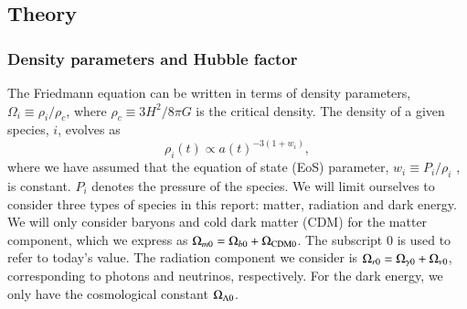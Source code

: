 

\subsection{Theory}\label{ssec:M1:theory}

\subsubsection{Density parameters and Hubble factor}

The Friedmann equation can be written in terms of density parameters, $\Omega_i\equiv \rho_i/\rho_c$, where $\rho_c\equiv 3H^2/8\pi G$ is the critical density. The density of a given species, $i$, evolves as \cite[Eq. (2.61)]{Dodelson}
\begin{equation}
    \rho_i(t)\propto a(t)^{-3(1+w_i)}, \label{eq:M1:theory:rho_i_eos_dependence}
\end{equation}
where we have assumed that the equation of state (EoS) parameter, $w_i \equiv P_i/\rho_i$ \cite[Eq. 2.60]{Dodelson}, is constant. $P_i$ denotes the pressure of the species. 
%
We will limit ourselves to consider three types of species in this report: matter, radiation and dark energy. We will only consider baryons and cold dark matter (CDM) for the matter component, which we express as $\Omega_{m0}=\Omega_{b0}+\Omega_\mathrm{CDM0}$. The subscript $0$ is used to refer to today's value. The radiation component we consider is $\Omega_{r0}=\Omega_{\gamma 0}+\Omega_{\nu 0}$, corresponding to photons and neutrinos, respectively. For the dark energy, we only have the cosmological constant $\Omega_{\Lambda 0}$.   

